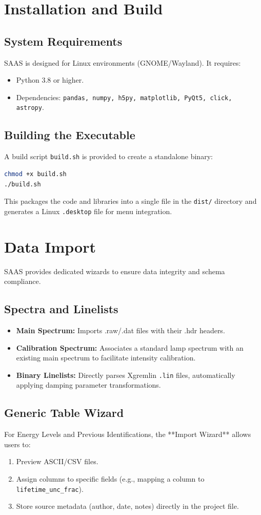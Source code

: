 \documentclass[11pt,a4paper]{article}
\begin{document}
\section{Installation and Build}
\subsection{System Requirements}
SAAS is designed for Linux environments (GNOME/Wayland). It requires:
\begin{itemize}
    \item Python 3.8 or higher.
    \item Dependencies: \texttt{pandas, numpy, h5py, matplotlib, PyQt5, click, astropy}.
\end{itemize}

\subsection{Building the Executable}
A build script \texttt{build.sh} is provided to create a standalone binary:
\begin{lstlisting}[language=bash]
chmod +x build.sh
./build.sh
\end{lstlisting}
This packages the code and libraries into a single file in the \texttt{dist/} directory and generates a Linux \texttt{.desktop} file for menu integration.

\section{Data Import}
SAAS provides dedicated wizards to ensure data integrity and schema compliance.

\subsection{Spectra and Linelists}
\begin{itemize}
    \item \textbf{Main Spectrum:} Imports .raw/.dat files with their .hdr headers.
    \item \textbf{Calibration Spectrum:} Associates a standard lamp spectrum with an existing main spectrum to facilitate intensity calibration.
    \item \textbf{Binary Linelists:} Directly parses Xgremlin \texttt{.lin} files, automatically applying damping parameter transformations.
\end{itemize}

\subsection{Generic Table Wizard}
For Energy Levels and Previous Identifications, the **Import Wizard** allows users to:
\begin{enumerate}
    \item Preview ASCII/CSV files.
    \item Assign columns to specific fields (e.g., mapping a column to \texttt{lifetime\_unc\_frac}).
    \item Store source metadata (author, date, notes) directly in the project file.
\end{enumerate}
\end{document}
